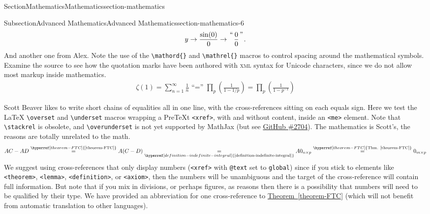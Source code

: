 \documentclass[twoside,10pt,]{article}
\newcommand{\xreffont}{\relax}
\newcommand{\mono}[1]{\texttt{#1}}
\newcommand{\initialism}[1]{\textsc{\MakeLowercase{#1}}}
\numberwithin{equation}{section}
\begin{document}
\begin{sectionptx}{Section}{Mathematics}{}{Mathematics}{}{}{section-mathematics}
\begin{subsectionptx}{Subsection}{Advanced Mathematics}{}{Advanced Mathematics}{}{}{section-mathematics-6}
\begin{gather*}
y \rightarrow \frac{\sin(0) }{0} \rightarrow {{\text{“}}\atop{}}\frac{0}{0}{{\text{”}}\atop{}}\text{.}
\end{gather*}
And another one from Alex.  Note the use of the \mono{\textbackslash{}mathord\{\}} and \mono{\textbackslash{}mathrel\{\}} macros to control spacing around the mathematical symbols.  Examine the source to see how the quotation marks have been authored with \initialism{XML} syntax for Unicode characters, since we do not allow most markup inside mathematics.%
\begin{gather*}
\zeta(1)=\sum_{n=1}^{\infty}\frac{1}{n}\mathrel{\text{ “}\mathord{=}{\text{” }}}\prod_{p}\left(\frac{1}{1-1/p}\right)=\prod_{p}\left(\frac{1}{1-p^{-1}}\right)
\end{gather*}
%
\par
Scott Beaver likes to write short chains of equalities all in one line, with the cross-references sitting on each equals sign.  Here we test the \LaTeX{} \mono{\textbackslash{}overset} and \mono{\textbackslash{}underset} macros wrapping a PreTeXt \mono{<xref>}, with and without content, inside an \mono{<me>} element.  Note that  \mono{\textbackslash{}stackrel} is obsolete, and \mono{\textbackslash{}overunderset} is not yet supported by MathJax (but see \href{https://github.com/mathjax/MathJax/issues/2704}{GitHub \#2704}).  The mathematics is Scott's, the reasons are totally unrelated to the math.%
\begin{equation*}
AC-AD
\overset{\hyperref[theorem-FTC]{\text{{\xreffont\ref{theorem-FTC}}}}}{=}
A(C-D)
\underset{\hyperref[definition-indefinite-integral]{\text{{\xreffont\ref{definition-indefinite-integral}}}}}{=}
A0_{n\times p}
\overset{\hyperref[theorem-FTC]{\text{Thm. {\xreffont\ref{theorem-FTC}}}}}{=}
0_{m\times p}
\end{equation*}
We suggest using cross-references that only display numbers (\mono{<xref>} with \mono{@text} set to \mono{global}) since if you stick to elements like \mono{<theorem>}, \mono{<lemma>}, \mono{<definition>}, or \mono{<axiom>}, then the numbers will be unambiguous and the target of the cross-reference will contain full information.  But note that if you mix in divisions, or perhaps figures, as reasons then there is a possibility that numbers will need to be qualified by their type.  We have provided an abbreviation for one cross-reference to \hyperref[theorem-FTC]{Theorem~{\xreffont\ref{theorem-FTC}}} (which will not benefit from automatic translation to other languages).%
\end{subsectionptx}
\end{sectionptx}
\end{document}
